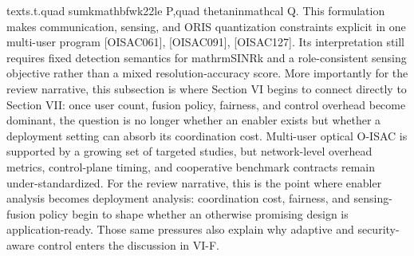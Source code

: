{}\markdownRendererDollarSign{}\markdownRendererDollarSign{}\markdownRendererSoftLineBreak
{}\markdownRendererDollarSign{}\markdownRendererDollarSign{}\markdownRendererSoftLineBreak
{}\markdownRendererBackslash{}text\markdownRendererLeftBrace{}s.t.\markdownRendererRightBrace{}\markdownRendererBackslash{}quad \markdownRendererBackslash{}sum\markdownRendererUnderscore{}k\markdownRendererPipe{}\markdownRendererBackslash{}mathbf\markdownRendererLeftBrace{}w\markdownRendererRightBrace{}\markdownRendererUnderscore{}k\markdownRendererPipe{}\markdownRendererUnderscore{}2\markdownRendererCircumflex{}2\markdownRendererBackslash{}le P,\markdownRendererBackslash{}quad \markdownRendererBackslash{}theta\markdownRendererUnderscore{}n\markdownRendererBackslash{}in\markdownRendererBackslash{}mathcal Q.\markdownRendererSoftLineBreak
{}\markdownRendererDollarSign{}\markdownRendererDollarSign{}\markdownRendererParagraphSeparator
{}This formulation makes communication, sensing, and ORIS quantization constraints explicit in one multi-user program [O\markdownRendererUnderscore{}ISAC\markdownRendererUnderscore{}061], [O\markdownRendererUnderscore{}ISAC\markdownRendererUnderscore{}091], [O\markdownRendererUnderscore{}ISAC\markdownRendererUnderscore{}127]. Its interpretation still requires fixed detection semantics for \markdownRendererDollarSign{}\markdownRendererBackslash{}mathrm\markdownRendererLeftBrace{}SINR\markdownRendererRightBrace{}\markdownRendererUnderscore{}k\markdownRendererDollarSign{} and a role-consistent sensing objective rather than a mixed resolution-accuracy score. More importantly for the review narrative, this subsection is where Section VI begins to connect directly to Section VII: once user count, fusion policy, fairness, and control overhead become dominant, the question is no longer whether an enabler exists but whether a deployment setting can absorb its coordination cost.\markdownRendererParagraphSeparator
{} Multi-user optical O-ISAC is supported by a growing set of targeted studies, but network-level overhead metrics, control-plane timing, and cooperative benchmark contracts remain under-standardized. For the review narrative, this is the point where enabler analysis becomes deployment analysis: coordination cost, fairness, and sensing-fusion policy begin to shape whether an otherwise promising design is application-ready. Those same pressures also explain why adaptive and security-aware control enters the discussion in VI-F.\markdownRendererInterblockSeparator
{}
\markdownRendererSectionEnd \markdownRendererSectionBegin
